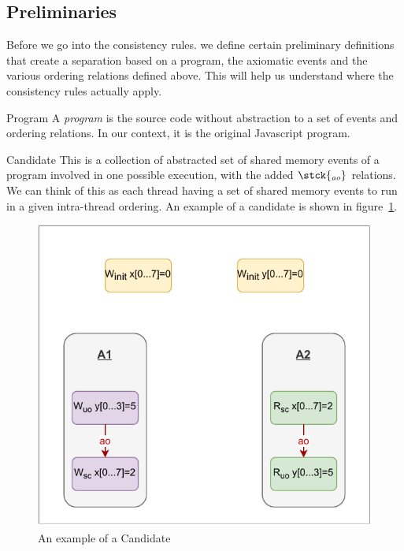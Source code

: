 \subsection{Preliminaries}
    
    Before we go into the consistency rules. we define certain preliminary definitions that create a separation based on a program, the axiomatic events and the various ordering relations defined above. This will help us understand where the consistency rules actually apply.    
    
    \begin{definition}{Program} 
        A \emph{program} is the source code without abstraction to a set of events and ordering relations. In our context, it is the original Javascript program. 
        
    \end{definition}
    
    \begin{definition}{Candidate}
        This is a collection of abstracted set of shared memory events of a program involved in one possible execution, with the added $\stck{_\textit{ao}}$ relations. We can think of this as each thread having a set of shared memory events to run in a given intra-thread ordering. An example of a candidate is shown in figure~\ref{fig:candidate}.
        
    
        \begin{figure}[H]
            \centering
            \includegraphics[scale=0.7]{Candidate.pdf}
            \caption{An example of a Candidate}
            \label{fig:candidate}
        \end{figure}
        
    \end{definition}
    
